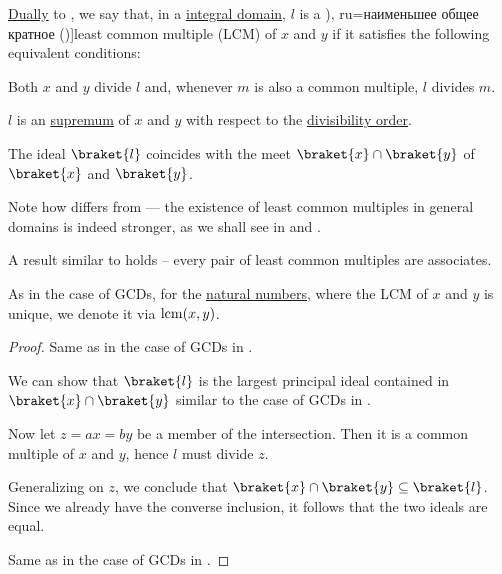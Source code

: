 \begin{definition}\label{def:lcm}
  \hyperref[thm:lattice_duality]{Dually} to , we say that, in a \hyperref[def:integral_domain]{integral domain}, \( l \) is a \term[bg=най-малко общо кратно (\cite[381]{ГеновИПр1991Алгебра}), ru=наименьшее общее кратное (\cite[exer. 3.6.3]{Винберг2014Алгебра})]{least common multiple} (LCM) of \( x \) and \( y \) if it satisfies the following equivalent conditions:

  \begin{thmenum}
     Both \( x \) and \( y \) divide \( l \) and, whenever \( m \) is also a common multiple, \( l \) divides \( m \).

     \( l \) is an \hyperref[def:extremal_points/supremum_and_infimum]{supremum} of \( x \) and \( y \) with respect to the \hyperref[thm:semiring_divisibility_order]{divisibility order}.

     The ideal \( \braket{ l } \) coincides with the meet \( \braket{ x } \cap \braket{ y } \) of \( \braket{ x } \) and \( \braket{ y } \).
  \end{thmenum}
\end{definition}
\begin{comments}
  \item Note how  differs from  --- the existence of least common multiples in general domains is indeed stronger, as we shall see in  and .

  \item A result similar to  holds -- every pair of least common multiples are associates.

  \item As in the case of GCDs, for the \hyperref[def:natural_numbers]{natural numbers}, where the LCM of \( x \) and \( y \) is unique, we denote it via \( \operatorname{lcm}(x, y) \).
\end{comments}
\begin{proof}
   Same as in the case of GCDs in .

   We can show that \( \braket{ l } \) is the largest principal ideal contained in \( \braket{ x } \cap \braket{ y } \) similar to the case of GCDs in .

  Now let \( z = ax = by \) be a member of the intersection. Then it is a common multiple of \( x \) and \( y \), hence \( l \) must divide \( z \).

  Generalizing on \( z \), we conclude that \( \braket{ x } \cap \braket{ y } \subseteq \braket{ l } \). Since we already have the converse inclusion, it follows that the two ideals are equal.

   Same as in the case of GCDs in .
\end{proof}

